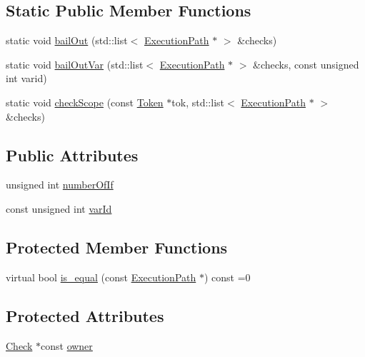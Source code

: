 \subsection*{Static Public Member Functions}
\begin{DoxyCompactItemize}
\item 
static void \hyperlink{class_execution_path_a013be7fe3aa5edde19b3034a4b8a79b4}{bail\-Out} (std\-::list$<$ \hyperlink{class_execution_path}{Execution\-Path} $\ast$ $>$ \&checks)
\item 
static void \hyperlink{class_execution_path_af2c8ddae903c6e1954f2084aa14d52ef}{bail\-Out\-Var} (std\-::list$<$ \hyperlink{class_execution_path}{Execution\-Path} $\ast$ $>$ \&checks, const unsigned int varid)
\item 
static void \hyperlink{class_execution_path_a10d2e4b5b1d3812c5ea89b36d3b4b117}{check\-Scope} (const \hyperlink{class_token}{Token} $\ast$tok, std\-::list$<$ \hyperlink{class_execution_path}{Execution\-Path} $\ast$ $>$ \&checks)
\end{DoxyCompactItemize}
\subsection*{Public Attributes}
\begin{DoxyCompactItemize}
\item 
unsigned int \hyperlink{class_execution_path_a21cb9232bca91662c0dbec2c22b020a3}{number\-Of\-If}
\item 
const unsigned int \hyperlink{class_execution_path_a4829716f56e79a29b3e50ec41e4e45aa}{var\-Id}
\end{DoxyCompactItemize}
\subsection*{Protected Member Functions}
\begin{DoxyCompactItemize}
\item 
virtual bool \hyperlink{class_execution_path_ac580fb17cf6906f4276fcb67df4ae4fe}{is\-\_\-equal} (const \hyperlink{class_execution_path}{Execution\-Path} $\ast$) const =0
\end{DoxyCompactItemize}
\subsection*{Protected Attributes}
\begin{DoxyCompactItemize}
\item 
\hyperlink{class_check}{Check} $\ast$const \hyperlink{class_execution_path_aa766128556dd128e22a461f97a290416}{owner}
\end{DoxyCompactItemize}


